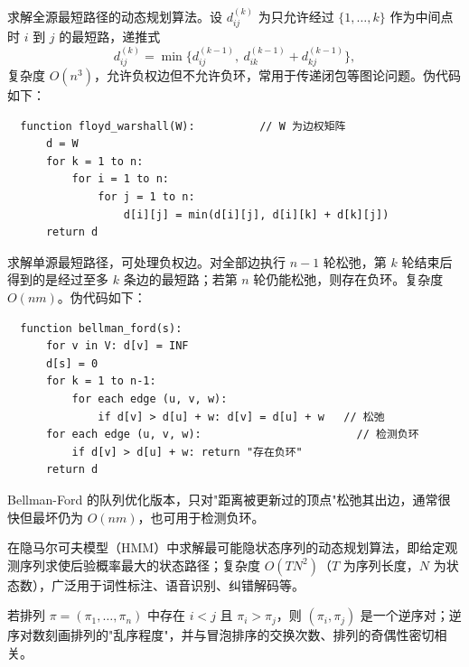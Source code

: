 \documentclass[12pt]{article}
\begin{document}
\begin{defn}
  求解全源最短路径的动态规划算法。设 $d^{(k)}_{ij}$ 为只允许经过 $\{1,\dots,k\}$ 作为中间点时 $i$ 到 $j$ 的最短路，递推式
  \[
    d^{(k)}_{ij} = \min\{d^{(k-1)}_{ij},\ d^{(k-1)}_{ik}+d^{(k-1)}_{kj}\},
  \]
  复杂度 $O(n^3)$，允许负权边但不允许负环，常用于传递闭包等图论问题。伪代码如下：
  \begin{verbatim}
  function floyd_warshall(W):          // W 为边权矩阵
      d = W
      for k = 1 to n:
          for i = 1 to n:
              for j = 1 to n:
                  d[i][j] = min(d[i][j], d[i][k] + d[k][j])
      return d
  \end{verbatim}
\end{defn}

\begin{defn}
  求解单源最短路径，可处理负权边。对全部边执行 $n-1$ 轮松弛，第 $k$ 轮结束后得到的是经过至多 $k$ 条边的最短路；若第 $n$ 轮仍能松弛，则存在负环。复杂度 $O(nm)$。伪代码如下：
  \begin{verbatim}
  function bellman_ford(s):
      for v in V: d[v] = INF
      d[s] = 0
      for k = 1 to n-1:
          for each edge (u, v, w):
              if d[v] > d[u] + w: d[v] = d[u] + w   // 松弛
      for each edge (u, v, w):                        // 检测负环
          if d[v] > d[u] + w: return "存在负环"
      return d
  \end{verbatim}
\end{defn}

\begin{defn}[SPFA]
  Bellman-Ford 的队列优化版本，只对"距离被更新过的顶点"松弛其出边，通常很快但最坏仍为 $O(nm)$，也可用于检测负环。
\end{defn}

\begin{defn}
  在隐马尔可夫模型（HMM）中求解最可能隐状态序列的动态规划算法，即给定观测序列求使后验概率最大的状态路径；复杂度 $O(T N^2)$（$T$ 为序列长度，$N$ 为状态数），广泛用于词性标注、语音识别、纠错解码等。
\end{defn}

\begin{defn}[逆序对的排列]
  若排列 $\pi=(\pi_1,\dots,\pi_n)$ 中存在 $i<j$ 且 $\pi_i>\pi_j$，则 $(\pi_i,\pi_j)$ 是一个逆序对；逆序对数刻画排列的"乱序程度"，并与冒泡排序的交换次数、排列的奇偶性密切相关。
\end{defn}
\end{document}
